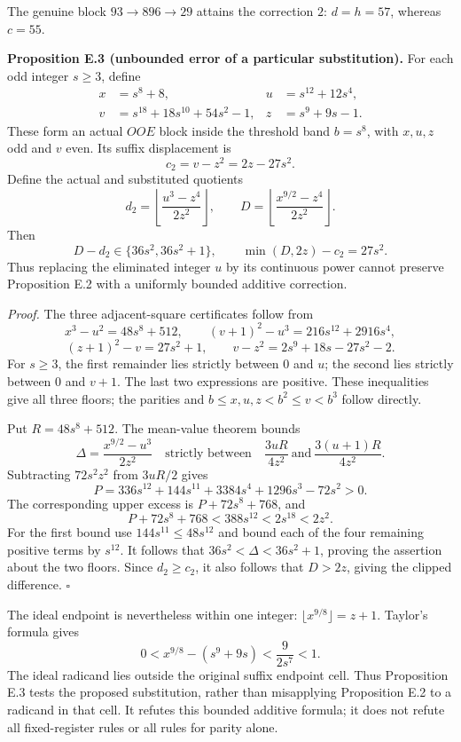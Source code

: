 \documentclass[12pt]{article}
\begin{document}
The genuine block \(93\to896\to29\) attains the correction \(2\):
\(d=h=57\), whereas \(c=55\).

\textbf{Proposition E.3 (unbounded error of a particular substitution).}
For each odd integer \(s\ge3\), define \[
\begin{aligned}
x&=s^8+8,& u&=s^{12}+12s^4,\\
v&=s^{18}+18s^{10}+54s^2-1,& z&=s^9+9s-1.
\end{aligned}
\] These form an actual \(OOE\) block inside the threshold band
\(b=s^8\), with \(x,u,z\) odd and \(v\) even. Its suffix displacement is
\[
c_2=v-z^2=2z-27s^2.
\] Define the actual and substituted quotients \[
d_2=\left\lfloor\frac{u^3-z^4}{2z^2}\right\rfloor,\qquad
D=\left\lfloor\frac{x^{9/2}-z^4}{2z^2}\right\rfloor.
\] Then \[
D-d_2\in\{36s^2,36s^2+1\},\qquad
\min(D,2z)-c_2=27s^2.
\] Thus replacing the eliminated integer \(u\) by its continuous power
cannot preserve Proposition E.2 with a uniformly bounded additive
correction.

\emph{Proof.} The three adjacent-square certificates follow from \[
x^3-u^2=48s^8+512,\qquad
(v+1)^2-u^3=216s^{12}+2916s^4,
\] \[
(z+1)^2-v=27s^2+1,\qquad
v-z^2=2s^9+18s-27s^2-2.
\] For \(s\ge3\), the first remainder lies strictly between \(0\) and
\(u\); the second lies strictly between \(0\) and \(v+1\). The last two
expressions are positive. These inequalities give all three floors; the
parities and \(b\le x,u,z<b^2\le v<b^3\) follow directly.

Put \(R=48s^8+512\). The mean-value theorem bounds \[
\Delta=\frac{x^{9/2}-u^3}{2z^2}
\quad\text{strictly between}\quad
\frac{3uR}{4z^2}\ \text{and}\ \frac{3(u+1)R}{4z^2}.
\] Subtracting \(72s^2z^2\) from \(3uR/2\) gives \[
P=336s^{12}+144s^{11}+3384s^4+1296s^3-72s^2>0.
\] The corresponding upper excess is \(P+72s^8+768\), and \[
P+72s^8+768<388s^{12}<2s^{18}<2z^2.
\] For the first bound use \(144s^{11}\le48s^{12}\) and bound each of
the four remaining positive terms by \(s^{12}\). It follows that
\(36s^2<\Delta<36s^2+1\), proving the assertion about the two floors.
Since \(d_2\ge c_2\), it also follows that \(D>2z\), giving the clipped
difference. \(\square\)

The ideal endpoint is nevertheless within one integer:
\(\lfloor x^{9/8}\rfloor=z+1\). Taylor's formula gives \[
0<x^{9/8}-(s^9+9s)<\frac9{2s^7}<1.
\] The ideal radicand lies outside the original suffix endpoint cell.
Thus Proposition E.3 tests the proposed substitution, rather than
misapplying Proposition E.2 to a radicand in that cell. It refutes this
bounded additive formula; it does not refute all fixed-register rules or
all rules for parity alone.
\end{document}
